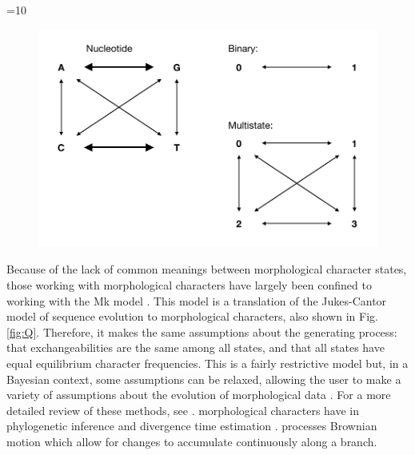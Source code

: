 \ifnum\value{num}=10{
\begin{figure}
\centering
\includegraphics[width=\textwidth]{Cambridge-Elements/manuscript.R3/submitted_figs/figure3}

\end{figure} }\else{}\fi

Because of the lack of common meanings between morphological character states, those working with morphological characters have largely been confined to working with the Mk model \citep{Lewis2001} .
This model is a translation of the Jukes-Cantor model \citep{Jukes1969} of sequence evolution to morphological characters, also shown in Fig. \ref{fig:Q}.
Therefore, it makes the same assumptions about the generating process: that exchangeabilities are the same among all  states, and that all states have equal equilibrium character frequencies.
This is a fairly restrictive model but, in a Bayesian context, some assumptions can be relaxed, allowing the user to make a variety of assumptions about the evolution of morphological data \citep{Nylander2004, Wright2016}.
For a more detailed review of these methods, see \citep{Wright2019}.
 morphological characters have  in phylogenetic inference \citep{goloboff2006, parins2017} and divergence time estimation \citep{AlvarezC2019}.
 processes  Brownian motion  which allow for changes to accumulate continuously along a branch.

